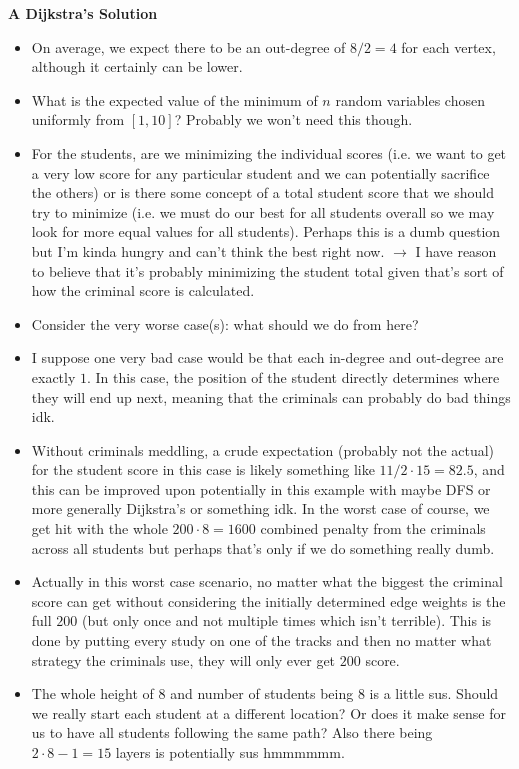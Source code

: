 \documentclass[a4paper, 12pt]{article}
\begin{document}
\textbf{A Dijkstra's Solution}
\begin{itemize}
    \item On average, we expect there to be an out-degree of \( 8/2 = 4 \) for each vertex, although it certainly can be lower.
    \item What is the expected value of the minimum of \( n \) random variables chosen uniformly from \( [1, 10] \)? Probably we won't need this though.
    \item For the students, are we minimizing the individual scores (i.e. we want to get a very low score for any particular student and we can potentially sacrifice the others) or is there some concept of a total student score that we should try to minimize (i.e. we must do our best for all students overall so we may look for more equal values for all students). Perhaps this is a dumb question but I'm kinda hungry and can't think the best right now. \( \longrightarrow \) I have reason to believe that it's probably minimizing the student total given that's sort of how the criminal score is calculated.
    \item Consider the very worse case(s): what should we do from here?
    \item I suppose one very bad case would be that each in-degree and out-degree are exactly \( 1 \). In this case, the position of the student directly determines where they will end up next, meaning that the criminals can probably do bad things idk.
    \item Without criminals meddling, a crude expectation (probably not the actual) for the student score in this case is likely something like \( 11/2 \cdot 15 = 82.5 \), and this can be improved upon potentially in this example with maybe DFS or more generally Dijkstra's or something idk. In the worst case of course, we get hit with the whole \( 200 \cdot 8 = 1600 \) combined penalty from the criminals across all students but perhaps that's only if we do something really dumb.
    \item Actually in this worst case scenario, no matter what the biggest the criminal score can get without considering the initially determined edge weights is the full \( 200 \) (but only once and not multiple times which isn't terrible). This is done by putting every study on one of the tracks and then no matter what strategy the criminals use, they will only ever get \( 200 \) score.
    \item The whole height of \( 8 \) and number of students being \( 8 \) is a little sus. Should we really start each student at a different location? Or does it make sense for us to have all students following the same path? Also there being \( 2 \cdot 8 - 1 = 15 \) layers is potentially sus hmmmmmm.

\end{itemize}
\end{document}
